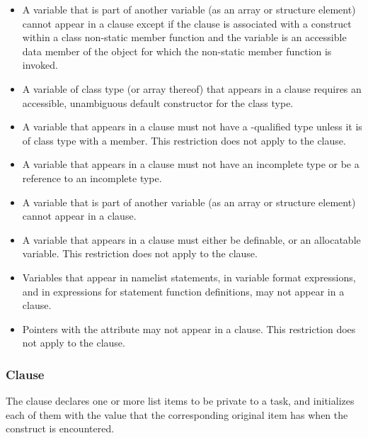 {{{{\begin{itemize}
\cppspecificstart
\item A variable that is part of another variable (as an array or structure element) cannot 
appear in a  clause except if the  clause is associated with a construct within a class non-static member function and the variable is an accessible data member of the object for which the non-static member function is invoked.

\item A variable of class type (or array thereof) that appears in a  clause requires 
an accessible, unambiguous default constructor for the class type. 
\cppspecificend

\ccppspecificstart
\item A variable that appears in a  clause must not have a -qualified type 
unless it is of class type with a  member. This restriction does not apply to 
the  clause.

\item A variable that appears in a  clause must not have an incomplete type or be a reference to an incomplete type.
\ccppspecificend


\fortranspecificstart
\item A variable that is part of another variable (as an array or structure element) cannot 
appear in a  clause.

\item A variable that appears in a  clause must either be definable, or an 
allocatable variable. This restriction does not apply to the  clause.

\item Variables that appear in namelist statements, in variable format expressions, and in 
expressions for statement function definitions, may not appear in a  clause.

\item Pointers with the  attribute may not appear in a  clause. This 
restriction does not apply to the  clause. 
\fortranspecificend
\end{itemize}










\subsubsection{ Clause}
\label{subsubsec:firstprivate clause}
\summary
The  clause declares one or more list items to be private to a task, and 
initializes each of them with the value that the corresponding original item has when the 
construct is encountered. 

}}}}
